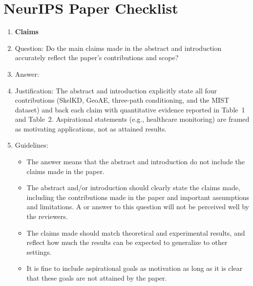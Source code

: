 \section*{NeurIPS Paper Checklist}

\begin{enumerate}

\item {\bf Claims}
    \item[] Question: Do the main claims made in the abstract and introduction accurately reflect the paper's contributions and scope?
    \item[] Answer: \answerYes{}
    \item[] Justification: The abstract and introduction explicitly state all four contributions (SkelKD, GeoAE, three-path conditioning, and the MIST dataset) and back each claim with quantitative evidence reported in Table~1 and Table~2. Aspirational statements (e.g., healthcare monitoring) are framed as motivating applications, not as attained results.
    \item[] Guidelines:
    \begin{itemize}
        \item The answer \answerNA{} means that the abstract and introduction do not include the claims made in the paper.
        \item The abstract and/or introduction should clearly state the claims made, including the contributions made in the paper and important assumptions and limitations. A \answerNo{} or \answerNA{} answer to this question will not be perceived well by the reviewers.
        \item The claims made should match theoretical and experimental results, and reflect how much the results can be expected to generalize to other settings.
        \item It is fine to include aspirational goals as motivation as long as it is clear that these goals are not attained by the paper.
    \end{itemize}


\end{enumerate}
